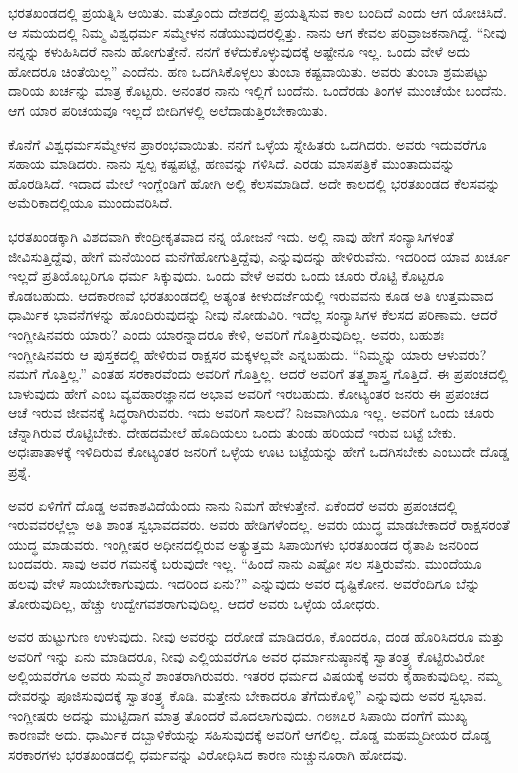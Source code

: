 ಭರತಖಂಡದಲ್ಲಿ ಪ್ರಯತ್ನಿಸಿ ಆಯಿತು. ಮತ್ತೊಂದು ದೇಶದಲ್ಲಿ ಪ್ರಯತ್ನಿಸುವ ಕಾಲ ಬಂದಿದೆ ಎಂದು ಆಗ ಯೋಚಿಸಿದೆ. ಆ ಸಮಯದಲ್ಲಿ ನಿಮ್ಮ ವಿಶ್ವಧರ್ಮ ಸಮ್ಮೇಳನ ನಡೆಯುವುದರಲ್ಲಿತ್ತು. ನಾನು ಆಗ ಕೇವಲ ಪರಿವ್ರಾಜಕನಾಗಿದ್ದೆ. “ನೀವು ನನ್ನನ್ನು ಕಳುಹಿಸಿದರೆ ನಾನು ಹೋಗುತ್ತೇನೆ. ನನಗೆ ಕಳೆದುಕೊಳ್ಳುವುದಕ್ಕೆ ಅಷ್ಟೇನೂ ಇಲ್ಲ. ಒಂದು ವೇಳೆ ಅದು ಹೋದರೂ ಚಿಂತೆಯಿಲ್ಲ” ಎಂದೆನು. ಹಣ ಒದಗಿಸಿಕೊಳ್ಳಲು ತುಂಬಾ ಕಷ್ಟವಾಯಿತು. ಅವರು ತುಂಬಾ ಶ್ರಮಪಟ್ಟು ದಾರಿಯ ಖರ್ಚನ್ನು ಮಾತ್ರ ಕೊಟ್ಟರು. ಅನಂತರ ನಾನು ಇಲ್ಲಿಗೆ ಬಂದೆನು. ಒಂದೆರಡು ತಿಂಗಳ ಮುಂಚೆಯೇ ಬಂದೆನು. ಆಗ ಯಾರ ಪರಿಚಯವೂ ಇಲ್ಲದೆ ಬೀದಿಗಳಲ್ಲಿ ಅಲೆದಾಡುತ್ತಿರಬೇಕಾಯಿತು.

ಕೊನೆಗೆ ವಿಶ್ವಧರ್ಮಸಮ್ಮೇಳನ ಪ್ರಾರಂಭವಾಯಿತು. ನನಗೆ ಒಳ್ಳೆಯ ಸ್ನೇಹಿತರು ಒದಗಿದರು. ಅವರು ಇದುವರೆಗೂ ಸಹಾಯ ಮಾಡಿದರು. ನಾನು ಸ್ವಲ್ಪ ಕಷ್ಟಪಟ್ಟೆ, ಹಣವನ್ನು ಗಳಿಸಿದೆ. ಎರಡು ಮಾಸಪತ್ರಿಕೆ ಮುಂತಾದುವನ್ನು ಹೊರಡಿಸಿದೆ. ಇದಾದ ಮೇಲೆ ಇಂಗ್ಲೆಂಡಿಗೆ ಹೋಗಿ ಅಲ್ಲಿ ಕೆಲಸಮಾಡಿದೆ. ಅದೇ ಕಾಲದಲ್ಲಿ ಭರತಖಂಡದ ಕೆಲಸವನ್ನು ಅಮೆರಿಕಾದಲ್ಲಿಯೂ ಮುಂದುವರಿಸಿದೆ.

ಭರತಖಂಡಕ್ಕಾಗಿ ವಿಶದವಾಗಿ ಕೇಂದ್ರೀಕೃತವಾದ ನನ್ನ ಯೋಜನೆ ಇದು. ಅಲ್ಲಿ ನಾವು ಹೇಗೆ ಸಂನ್ಯಾಸಿಗಳಂತೆ ಜೀವಿಸುತ್ತಿದ್ದೆವು, ಹೇಗೆ ಮನೆಯಿಂದ ಮನೆಗೆ\break ಹೋಗುತ್ತಿದ್ದೆವು, ಎನ್ನುವುದನ್ನು ಹೇಳಿರುವೆನು. ಇದರಿಂದ ಯಾವ ಖರ್ಚೂ ಇಲ್ಲದೆ ಪ್ರತಿಯೊಬ್ಬರಿಗೂ ಧರ್ಮ ಸಿಕ್ಕುವುದು. ಒಂದು ವೇಳೆ ಅವರು ಒಂದು ಚೂರು ರೊಟ್ಟಿ ಕೊಟ್ಟರೂ ಕೊಡಬಹುದು. ಆದಕಾರಣವೆ ಭರತಖಂಡದಲ್ಲಿ ಅತ್ಯಂತ ಕೀಳುದರ್ಜೆಯಲ್ಲಿ ಇರುವವನು ಕೂಡ ಅತಿ ಉತ್ತಮವಾದ ಧಾರ್ಮಿಕ ಭಾವನೆಗಳನ್ನು ಹೊಂದಿರುವುದನ್ನು ನೀವು ನೋಡುವಿರಿ. ಇದೆಲ್ಲ ಸಂನ್ಯಾಸಿಗಳ ಕೆಲಸದ ಪರಿಣಾಮ. ಆದರೆ ಇಂಗ್ಲೀಷಿನವರು ಯಾರು? ಎಂದು ಯಾರನ್ನಾದರೂ ಕೇಳಿ, ಅವರಿಗೆ ಗೊತ್ತಿರುವುದಿಲ್ಲ. ಅವರು, ಬಹುಶಃ ಇಂಗ್ಲೀಷಿನವರು ಆ ಪುಸ್ತಕದಲ್ಲಿ ಹೇಳಿರುವ ರಾಕ್ಷಸರ ಮಕ್ಕಳಲ್ಲವೇ ಎನ್ನಬಹುದು. “ನಿಮ್ಮನ್ನು ಯಾರು ಆಳುವರು? ನಮಗೆ ಗೊತ್ತಿಲ್ಲ.” ಎಂತಹ ಸರಕಾರವೆಂದು ಅವರಿಗೆ ಗೊತ್ತಿಲ್ಲ. ಆದರೆ ಅವರಿಗೆ ತತ್ತ್ವಶಾಸ್ತ್ರ ಗೊತ್ತಿದೆ. ಈ ಪ್ರಪಂಚದಲ್ಲಿ ಬಾಳುವುದು ಹೇಗೆ ಎಂಬ ವ್ಯವಹಾರಜ್ಞಾನದ ಅಭಾವ ಅವರಿಗೆ ಇರಬಹುದು. ಕೋಟ್ಯಂತರ ಜನರು ಈ ಪ್ರಪಂಚದ ಆಚೆ ಇರುವ ಜೀವನಕ್ಕೆ ಸಿದ್ಧರಾಗಿರುವರು. ಇದು ಅವರಿಗೆ ಸಾಲದೆ? ನಿಜವಾಗಿಯೂ ಇಲ್ಲ. ಅವರಿಗೆ ಒಂದು ಚೂರು ಚೆನ್ನಾಗಿರುವ ರೊಟ್ಟಿಬೇಕು. ದೇಹದಮೇಲೆ ಹೊದಿಯಲು ಒಂದು ತುಂಡು ಹರಿಯದೆ ಇರುವ ಬಟ್ಟೆ ಬೇಕು. ಅಧಃಪಾತಾಳಕ್ಕೆ ಇಳಿದಿರುವ ಕೋಟ್ಯಂತರ ಜನರಿಗೆ ಒಳ್ಳೆಯ ಊಟ ಬಟ್ಟೆಯನ್ನು ಹೇಗೆ ಒದಗಿಸಬೇಕು ಎಂಬುದೇ ದೊಡ್ಡ ಪ್ರಶ್ನೆ.

ಅವರ ಏಳಿಗೆಗೆ ದೊಡ್ಡ ಅವಕಾಶವಿದೆಯೆಂದು ನಾನು ನಿಮಗೆ ಹೇಳುತ್ತೇನೆ. ಏಕೆಂದರೆ ಅವರು ಪ್ರಪಂಚದಲ್ಲಿ ಇರುವವರಲ್ಲೆಲ್ಲಾ ಅತಿ ಶಾಂತ ಸ್ವಭಾವದವರು. ಅವರು ಹೇಡಿಗಳೆಂದಲ್ಲ. ಅವರು ಯುದ್ಧ ಮಾಡಬೇಕಾದರೆ ರಾಕ್ಷಸರಂತೆ ಯುದ್ಧ ಮಾಡುವರು. ಇಂಗ್ಲೀಷರ ಅಧೀನದಲ್ಲಿರುವ ಅತ್ಯುತ್ತಮ ಸಿಪಾಯಿಗಳು ಭರತಖಂಡದ ರೈತಾಪಿ ಜನರಿಂದ ಬಂದವರು. ಸಾವು ಅವರ ಗಮನಕ್ಕೆ ಬರುವುದೇ ಇಲ್ಲ. “ಹಿಂದೆ ನಾನು ಎಷ್ಟೋ ಸಲ ಸತ್ತಿರುವೆನು. ಮುಂದೆಯೂ ಹಲವು ವೇಳೆ ಸಾಯಬೇಕಾಗುವುದು. ಇದರಿಂದ ಏನು?” ಎನ್ನುವುದು ಅವರ ದೃಷ್ಟಿಕೋನ. ಅವರೆಂದಿಗೂ ಬೆನ್ನು ತೋರುವುದಿಲ್ಲ, ಹೆಚ್ಚು ಉದ್ವೇಗವಶರಾಗುವುದಿಲ್ಲ. ಆದರೆ ಅವರು ಒಳ್ಳೆಯ ಯೋಧರು.

ಅವರ ಹುಟ್ಟುಗುಣ ಉಳುವುದು. ನೀವು ಅವರನ್ನು ದರೋಡೆ ಮಾಡಿದರೂ, ಕೊಂದರೂ, ದಂಡ ಹೊರಿಸಿದರೂ ಮತ್ತು ಅವರಿಗೆ ಇನ್ನು ಏನು ಮಾಡಿದರೂ, ನೀವು ಎಲ್ಲಿಯವರೆಗೂ ಅವರ ಧರ್ಮಾನುಷ್ಠಾನಕ್ಕೆ ಸ್ವಾತಂತ್ರ್ಯ ಕೊಟ್ಟಿರುವಿರೋ ಅಲ್ಲಿಯವರೆಗೂ ಅವರು ಸುಮ್ಮನೆ ಶಾಂತರಾಗಿರುವರು. ಇತರರ ಧರ್ಮದ ವಿಷಯಕ್ಕೆ ಅವರು ಕೈಹಾಕುವುದಿಲ್ಲ. ನಮ್ಮ ದೇವರನ್ನು ಪೂಜಿಸುವುದಕ್ಕೆ ಸ್ವಾತಂತ್ರ್ಯ ಕೊಡಿ. ಮತ್ತೇನು ಬೇಕಾದರೂ ತೆಗೆದುಕೊಳ್ಳಿ” ಎನ್ನುವುದು ಅವರ ಸ್ವಭಾವ. ಇಂಗ್ಲೀಷರು ಅದನ್ನು ಮುಟ್ಟಿದಾಗ ಮಾತ್ರ ತೊಂದರೆ ಮೊದಲಾಗುವುದು. ೧೮೫೭ರ ಸಿಪಾಯಿ ದಂಗೆಗೆ ಮುಖ್ಯ ಕಾರಣವೇ ಅದು. ಧಾರ್ಮಿಕ ದಬ್ಬಾಳಿಕೆಯನ್ನು ಸಹಿಸುವುದಕ್ಕೆ ಅವರಿಗೆ ಆಗಲಿಲ್ಲ. ದೊಡ್ಡ ಮಹಮ್ಮದೀಯರ ದೊಡ್ಡ ಸರಕಾರಗಳು ಭರತಖಂಡದಲ್ಲಿ ಧರ್ಮವನ್ನು ವಿರೋಧಿಸಿದ ಕಾರಣ ನುಚ್ಚುನೂರಾಗಿ ಹೋದವು.

